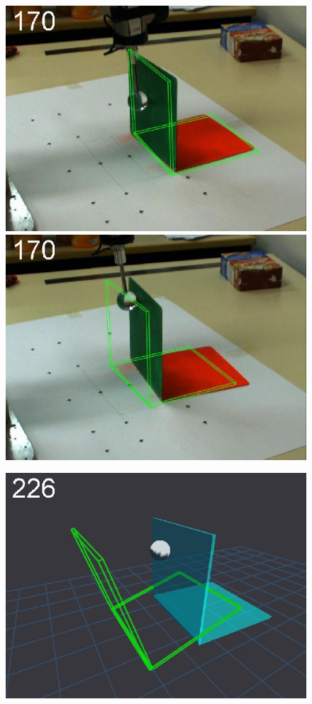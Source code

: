 \begin{figure}[tb]
{\includegraphics[width=\imgBXwid]{./B2_2exp_38_2}
\includegraphics[width=\imgBXwid]{./B2_LWPR1_58_2}
}
\centerline{
\includegraphics[width=\imgBXwid]{./B1_1exp_20_3}
}
\end{figure}
